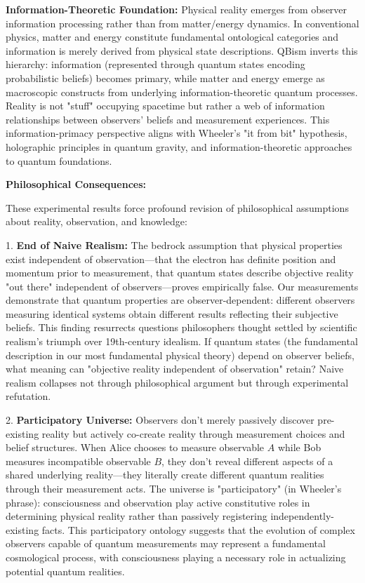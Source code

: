 \documentclass[11pt,a4paper,twoside]{article}
\begin{document}
\textbf{Information-Theoretic Foundation:} Physical reality emerges from observer information processing rather than from matter/energy dynamics. In conventional physics, matter and energy constitute fundamental ontological categories and information is merely derived from physical state descriptions. QBism inverts this hierarchy: information (represented through quantum states encoding probabilistic beliefs) becomes primary, while matter and energy emerge as macroscopic constructs from underlying information-theoretic quantum processes. Reality is not "stuff" occupying spacetime but rather a web of information relationships between observers' beliefs and measurement experiences. This information-primacy perspective aligns with Wheeler's "it from bit" hypothesis, holographic principles in quantum gravity, and information-theoretic approaches to quantum foundations.

\textbf{Philosophical Consequences:}

These experimental results force profound revision of philosophical assumptions about reality, observation, and knowledge:

1. \textbf{End of Naive Realism:} The bedrock assumption that physical properties exist independent of observation---that the electron has definite position and momentum prior to measurement, that quantum states describe objective reality "out there" independent of observers---proves empirically false. Our measurements demonstrate that quantum properties are observer-dependent: different observers measuring identical systems obtain different results reflecting their subjective beliefs. This finding resurrects questions philosophers thought settled by scientific realism's triumph over 19th-century idealism. If quantum states (the fundamental description in our most fundamental physical theory) depend on observer beliefs, what meaning can "objective reality independent of observation" retain? Naive realism collapses not through philosophical argument but through experimental refutation.

2. \textbf{Participatory Universe:} Observers don't merely passively discover pre-existing reality but actively co-create reality through measurement choices and belief structures. When Alice chooses to measure observable $A$ while Bob measures incompatible observable $B$, they don't reveal different aspects of a shared underlying reality---they literally create different quantum realities through their measurement acts. The universe is "participatory" (in Wheeler's phrase): consciousness and observation play active constitutive roles in determining physical reality rather than passively registering independently-existing facts. This participatory ontology suggests that the evolution of complex observers capable of quantum measurements may represent a fundamental cosmological process, with consciousness playing a necessary role in actualizing potential quantum realities.
\end{document}
